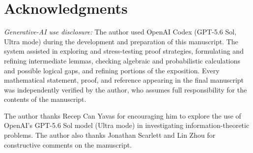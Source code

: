 \documentclass[11pt,onecolumn]{IEEEtran}
\begin{document}
\section*{Acknowledgments}
\emph{Generative-AI use disclosure:}
The author used OpenAI Codex (GPT-5.6 Sol, Ultra mode) during the development and preparation of this
manuscript. The system assisted in exploring and stress-testing proof
strategies, formulating and refining intermediate lemmas, checking
algebraic and probabilistic calculations and possible logical gaps, and
refining portions of the exposition. Every mathematical statement, proof, and reference appearing in
the final manuscript was independently verified by the author, who
assumes full responsibility for the contents of the manuscript.

The author thanks Recep Can Yavas for encouraging him to explore the use of
OpenAI's GPT-5.6 Sol model (Ultra mode) in investigating
information-theoretic problems. The author also thanks Jonathan Scarlett and
Lin Zhou for constructive comments on the manuscript.


\end{document}
